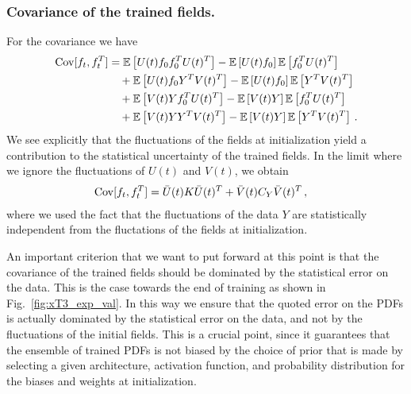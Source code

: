 \subsubsection{Covariance of the trained fields.}
\label{sec:Covariance}
For the covariance we have 
\begin{align}
    \mathrm{Cov}[f_t,f_t^T]
        &= \mathbb{E}\left[U(t) f_0 f_0^T U(t)^T\right] 
            - \mathbb{E}\left[U(t) f_0\right] \mathbb{E}\left[f_0^T U(t)^T\right]  \nonumber \\
        &\quad + \mathbb{E}\left[U(t) f_0 Y^T V(t)^T\right] 
            - \mathbb{E}\left[U(t) f_0\right] \mathbb{E}\left[Y^T V(t)^T\right] \nonumber \\
        &\quad + \mathbb{E}\left[V(t) Y f_0^T U(t)^T\right]
            - \mathbb{E}\left[V(t) Y\right] \mathbb{E}\left[f_0^T U(t)^T\right] \nonumber \\
    \label{eq:CovAtT}
        &\quad + \mathbb{E}\left[V(t) Y Y^T V(t)^T\right]
            - \mathbb{E}\left[V(t) Y\right] \mathbb{E}\left[Y^T V(t)^T\right] \, .
\end{align}
We see explicitly that the fluctuations of the fields at initialization yield a contribution to 
the statistical uncertainty of the trained fields. In the limit where we ignore the fluctuations 
of $U(t)$ and $V(t)$, we obtain
\begin{align}
    \mathrm{Cov}[f_t,f_t^T]
        &= \bar{U}(t) K \bar{U}(t)^T 
            + \bar{V}(t) C_Y \bar{V}(t)^T\, ,
\end{align}
where we used the fact that the fluctuations of the data $Y$ are statistically independent from 
the fluctations of the fields at initialization. 

An important criterion that we want to put forward at this point is that the covariance of the trained
fields should be dominated by the statistical error on the data. This is the case towards the end of
training as shown in Fig.~\ref{fig:xT3_exp_val}. In this way we ensure that the quoted error 
on the PDFs is actually dominated by the statistical error on the data, and not by the fluctuations of the
initial fields. This is a crucial point, since it guarantees that the ensemble of trained PDFs is not biased by the
choice of prior that is made by selecting a given architecture, activation function, and probability distribution 
for the biases and weights at initialization. 

\FloatBarrier
